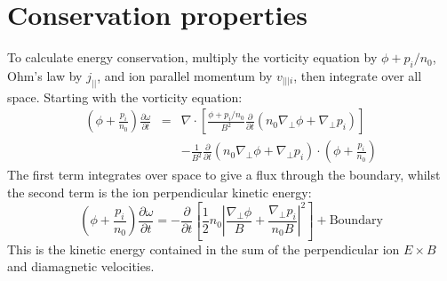 \documentclass[12pt,a4paper]{article}
\begin{document}
\section{Conservation properties}
\label{sec:conservation}

To calculate energy conservation, multiply the vorticity equation by $\phi + p_i/n_0$, Ohm's law by $j_{||}$, and ion parallel momentum by $v_{|||i}$, then integrate over all space. Starting with the vorticity equation:
\begin{eqnarray*}
\left(\phi + \frac{p_i}{n_0}\right)\frac{\partial\omega}{\partial t} &=& \nabla\cdot\left[\frac{\phi + p_i/n_0}{B^2}\frac{\partial}{\partial t}\left(n_0\nabla_\perp\phi + \nabla_\perp p_i\right)\right] \\
&& - \frac{1}{B^2}\frac{\partial}{\partial t}\left(n_0\nabla_\perp\phi + \nabla_\perp p_i\right)\cdot\left(\phi + \frac{p_i}{n_0}\right)
\end{eqnarray*}
The first term integrates over space to give a flux through the boundary, whilst the second term is the ion perpendicular kinetic energy:
\[
\left(\phi + \frac{p_i}{n_0}\right)\frac{\partial\omega}{\partial t} = -\frac{\partial}{\partial t}\left[\frac{1}{2}n_0\left|\frac{\nabla_\perp\phi}{B} + \frac{\nabla_\perp p_i}{n_0B}\right|^2\right] + \mathrm{Boundary}
\]
This is the kinetic energy contained in the sum of the perpendicular ion $E\times B$ and diamagnetic velocities.
\end{document}
